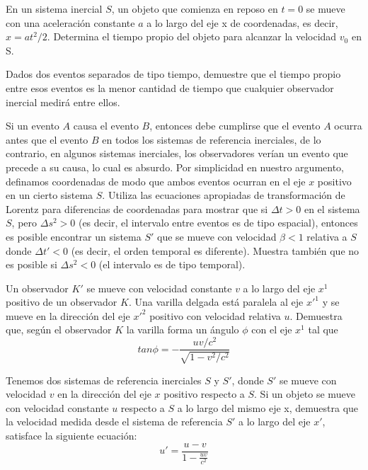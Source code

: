 \documentclass[12pt]{article}
\newenvironment{exercise}[2][Ejercicio]{\begin{trivlist} 
\item[\hskip \labelsep {\bfseries #1}\hskip \labelsep {\bfseries #2.}]}{\end{trivlist}}
\begin{document}
\begin{exercise}{1.10}
En un sistema inercial $S$, un objeto que comienza en reposo en $t=0$ se mueve con una aceleración constante $a$ a lo largo del eje x de coordenadas, es decir, $x=at^2/2$. Determina el tiempo propio del objeto para alcanzar la velocidad $v_0$ en S.
\end{exercise}

\begin{exercise}{1.11}
Dados dos eventos separados de tipo tiempo, demuestre que el tiempo propio entre esos eventos es la menor cantidad de tiempo que cualquier observador inercial medirá entre ellos.    
\end{exercise}

\begin{exercise}{1.12}
Si un evento $A$ causa el evento $B$, entonces debe cumplirse que el evento $A$ ocurra antes que el evento $B$ en todos los sistemas de referencia inerciales, de lo contrario, en algunos sistemas inerciales, los observadores verían un evento que precede a su causa, lo cual es absurdo. Por simplicidad en nuestro argumento, definamos coordenadas de modo que ambos eventos ocurran en el eje 
$x$ positivo en un cierto sistema $S$. Utiliza las ecuaciones apropiadas de transformación de Lorentz para diferencias de coordenadas para mostrar que si $\Delta t > 0$ en el sistema $S$, pero 
$\Delta s^2>0$ (es decir, el intervalo entre eventos es de tipo espacial), entonces es posible encontrar un sistema $S'$ que se mueve con velocidad $\beta < 1$ relativa a $S$ donde $\Delta t' < 0$
 (es decir, el orden temporal es diferente). Muestra también que no es posible si $\Delta s^2 < 0$ (el intervalo es de tipo temporal).
\end{exercise}

\begin{exercise}{1.13}
Un observador $K'$ se mueve con velocidad constante $v$ a lo largo del eje  $x^1$ positivo de un observador $K$. Una varilla delgada está paralela al eje $x'^1$ y se mueve en la dirección del eje 
$x'^2$ positivo con velocidad relativa $u$. Demuestra que, según el observador $K$ la varilla forma un ángulo $\phi$ con el eje $x^1$ tal que
\[
tan\phi=-\frac{uv/c^2}{\sqrt{1-v^2/c^2}}
\]
\end{exercise}

\begin{exercise}{1.14} 
Tenemos dos sistemas de referencia inerciales $S$ y $S'$, donde $S'$ se mueve con velocidad $v$ en la dirección del eje $x$ positivo respecto a $S$. Si un objeto se mueve con velocidad constante $u$ respecto a $S$ a lo largo del mismo eje x, demuestra que la velocidad medida desde el sistema de referencia $S'$ a lo largo del eje $x'$, satisface la siguiente ecuación:
\[
u' = \frac{u - v}{1 - \frac{u v}{c^2}}
\]
\end{exercise}
\end{document}
